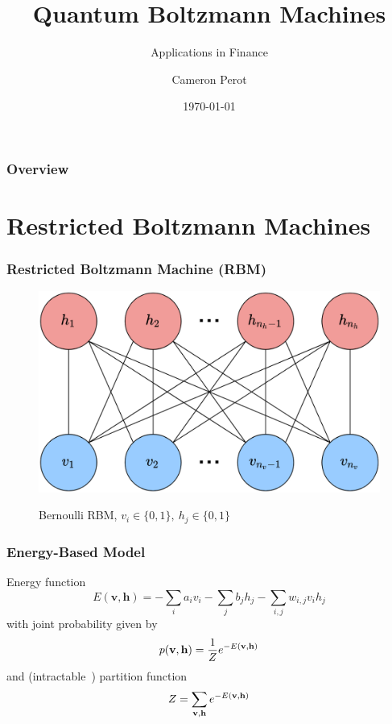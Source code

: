 \documentclass{beamer}
\title{Quantum Boltzmann Machines}
\subtitle{Applications in Finance}
\author{Cameron Perot}
\institute{JSC}
\date{\today}
\begin{document}

\maketitle


\begin{frame}
    \frametitle{Overview}
    \tableofcontents
\end{frame}


\section{Restricted Boltzmann Machines}

\begin{frame}
    \frametitle{Restricted Boltzmann Machine (RBM)}
    \begin{figure}
        \includegraphics[width=0.8\linewidth]{rbm_diagram.png}
        \label{rbm_diagram}
        \caption{Bernoulli RBM, \( v_i \in \{0, 1\}, \ h_j \in \{0, 1\} \)}
    \end{figure}
\end{frame}

\begin{frame}
    \frametitle{Energy-Based Model}
    Energy function
    \[
        E(\mathbf{v}, \mathbf{h}) = -\sum_i a_i v_i - \sum_j b_j h_j - \sum_{i,j} w_{i,j} v_i h_j
    \]
    with joint probability given by
    \[
        p(\mathbf{v}, \mathbf{h}) = \frac{1}{Z} e^{-E(\mathbf{v}, \mathbf{h})}
    \]
    and (intractable~\cite{long_servedio_2010}) partition function
    \[
        Z = \sum_{\mathbf{v},\mathbf{h}} e^{-E(\mathbf{v}, \mathbf{h})}
    \]
\end{frame}
\end{document}
